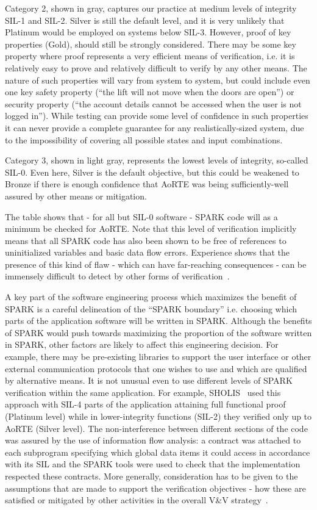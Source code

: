 \documentclass{llncs}
\begin{document}
Category 2, shown in gray, captures our practice at medium levels of integrity
SIL-1 and SIL-2. Silver is still the default level, and it is very unlikely
that Platinum would be employed on systems below SIL-3.  However, proof of key
properties (Gold), should still be strongly considered. There may be some key
property where proof represents a very efficient means of verification, i.e. it
is relatively easy to prove and relatively difficult to verify by any other
means. The nature of such properties will vary from system to system, but could
include even one key safety property (``the lift will not move when the doors
are open'') or security property (``the account details cannot be accessed when
the user is not logged in''). While testing can provide some level of
confidence in such properties it can never provide a complete guarantee for any
realistically-sized system, due to the impossibility of covering all possible
states and input combinations.

Category 3, shown in light gray, represents the lowest levels of integrity,
so-called SIL-0. Even here, Silver is the default objective,
but this could be weakened to Bronze if there is enough confidence
that AoRTE was being sufficiently-well assured by other means or mitigation.

The table shows that - for all but SIL-0 software - SPARK code will as a
minimum be checked for AoRTE. Note that this level of verification implicitly
means that all SPARK code has also been shown to be free of references to
uninitialized variables and basic data flow errors.  Experience shows that the
presence of this kind of flaw - which can have far-reaching consequences - can
be immensely difficult to detect by other forms of
verification~\cite{King2000TSE}.

A key part of the software engineering process which maximizes the benefit of
SPARK is a careful delineation of the ``SPARK boundary'' i.e. choosing which
parts of the application software will be written in SPARK. Although the
benefits of SPARK would push towards maximizing the proportion of the software
written in SPARK, other factors are likely to affect this engineering
decision. For example, there may be pre-existing libraries to support the user
interface or other external communication protocols that one wishes to use and
which are qualified by alternative means. It is not unusual even to use
different levels of SPARK verification within the same application. For example,
SHOLIS~\cite{Croxford2005Manifesto} used this approach with SIL-4 parts of the
application attaining full functional proof (Platinum level) while in
lower-integrity functions (SIL-2) they verified only up to AoRTE (Silver level).
The non-interference between different sections of the code was assured by the
use of information flow analysis: a contract was attached to each subprogram
specifying which global data items it could access in accordance with its SIL
and the SPARK tools were used to check that the implementation respected these
contracts. More generally, consideration has to be given to the assumptions
that are made to support the verification objectives - how these are satisfied
or mitigated by other activities in the overall V\&V
strategy~\cite{kanig2014tap}.
\end{document}
